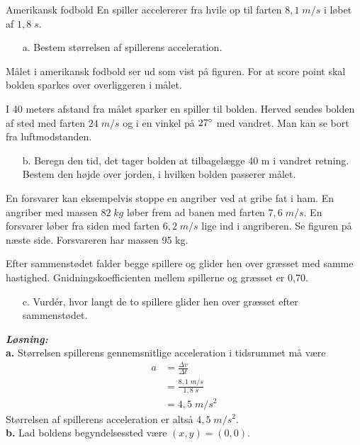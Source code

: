 \documentclass{report}
\newcommand{\sol}{\setlength{\parindent}{0cm}\textbf{\textit{Løsning:}}\setlength{\parindent}{1cm}}
\begin{document}
\begin{question}{Amerikansk fodbold}{}
En spiller accelererer fra hvile op til farten $8,1 \;\unit{ m/s}$ i løbet af $1,8 \;\unit{s} $.
\begin{itemize}
  \item[a.] Bestem størrelsen af spillerens acceleration.
\end{itemize}

Målet i amerikansk fodbold ser ud som vist på figuren. For at score point skal bolden sparkes over overliggeren i målet.

I 40 meters afstand fra målet sparker en spiller til bolden. Herved sendes bolden af sted med farten $24 \;\unit{ m/s}$ og i en vinkel på $27 \degree $ med vandret. Man kan se bort fra luftmodstanden.
\begin{itemize}
  \item[b.] Beregn den tid, det tager bolden at tilbagelægge 40 m i vandret retning. 
Bestem den højde over jorden, i hvilken bolden passerer målet.
\end{itemize}

En forsvarer kan eksempelvis stoppe en angriber ved at gribe fat i ham. En angriber med massen $82 \;\unit{ kg}$ løber frem ad banen med farten $7,6 \;\unit{ m/s}$.
En forsvarer løber fra siden med farten $6,2 \;\unit{ m/s}$ lige ind i angriberen. Se figuren på næste side. Forsvareren har massen 95 kg.

Efter sammenstødet falder begge spillere og glider hen over græsset med samme hastighed. Gnidningskoefficienten mellem spillerne og græsset er 0,70.
\begin{itemize}
  \item[c.] Vurdér, hvor langt de to spillere glider hen over græsset efter sammenstødet.
\end{itemize}
\end{question}
\sol \\
\textbf{a.}
Størrelsen spillerens gennemsnitlige acceleration i tidsrummet må være 
\begin{equation*}
\begin{split}
  a&=\frac{\Delta v}{\Delta t}\\
  &=\frac{8,1 \;\unit{m/s} }{1,8 \;\unit{s} }\\
  &=4,5 \;\unit{m/s^2} 
\end{split}
\end{equation*}
Størrelsen af spillerens acceleration er altså $4,5 \;\unit{m/s^2} $.\\[1ex]
\textbf{b.}
Lad boldens begyndelsessted være $(x,y)=(0,0)$.
\end{document}
